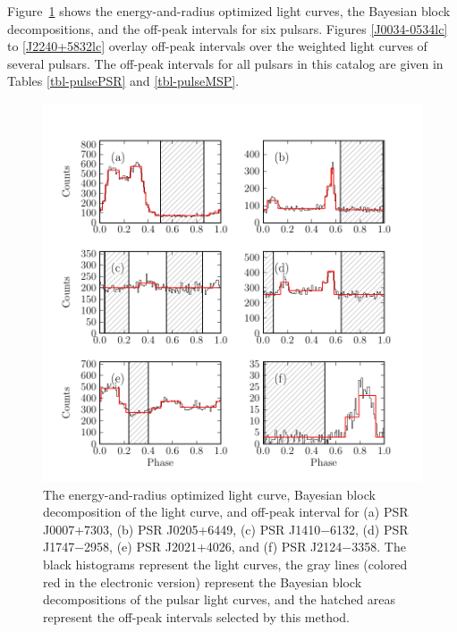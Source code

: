 Figure~\ref{off_peak_select} shows the energy-and-radius optimized
light curves, the Bayesian block decompositions, 
and the off-peak intervals for six pulsars.  
Figures \ref{J0034-0534lc} to \ref{J2240+5832lc} overlay off-peak intervals
over the weighted light curves of several pulsars.
The off-peak
intervals for all pulsars in this catalog are given in Tables \ref{tbl-pulsePSR} and \ref{tbl-pulseMSP}.

\begin{figure}
  \includegraphics{chapters/offpeak/figures/off_peak_phase_color.pdf}
  \caption{The energy-and-radius optimized light curve, Bayesian block decomposition of the        
  light curve, and off-peak interval for
  (a) PSR J0007+7303, (b) PSR J0205+6449, (c) PSR J1410$-$6132,
  (d) PSR J1747$-$2958, (e) PSR J2021+4026, and (f) PSR J2124$-$3358.
  The black histograms represent the light curves,
  the gray lines (colored red in the electronic version)
  represent the Bayesian block decompositions of the pulsar light curves, and
  the hatched areas represent the off-peak intervals selected by this method.}
  \label{off_peak_select}
\end{figure}

